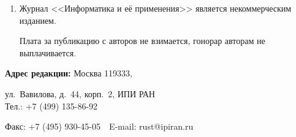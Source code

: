 {{\begin{enumerate}
\begin{itemize}
\item использовать attach (присоединение);


\item в случае больших объемов информации возможно


использование общеизвестных архиваторов (ZIP, RAR);


\item в состав электронной версии статьи должны входить: файл, содержащий текст статьи, и файл(ы),


содержащий(е) иллюстрации.


\end{itemize}


\item Журнал <<Информатика и её применения>> является некоммерческим изданием. 


Плата за публикацию с авторов не взимается, гонорар авторам не выплачивается.


\end{enumerate}


\thispagestyle{empty}





\medskip


\noindent


\textbf{Адрес редакции:} Москва 119333,


ул.~Вавилова, д.~44, корп.~2, ИПИ РАН\\


Тел.: +7 (499) 135-86-92\ \


Факс:  +7 (495) 930-45-05\ \  E-mail:   rust@ipiran.ru }





\vfill


















}
